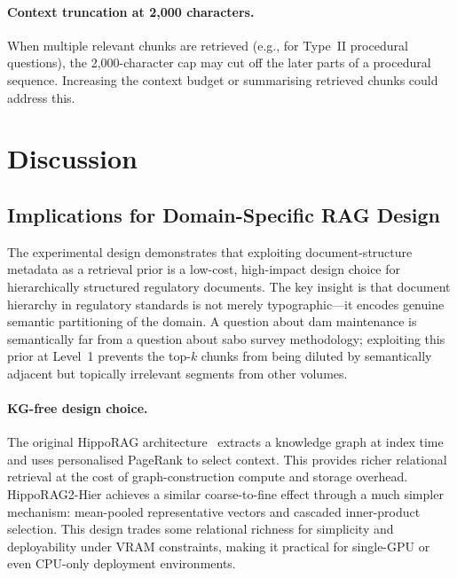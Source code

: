 \documentclass[twocolumn]{article}
\begin{document}
\paragraph{Context truncation at 2,000 characters.}
When multiple relevant chunks are retrieved (e.g., for Type~II procedural
questions), the 2,000-character cap may cut off the later parts of a
procedural sequence.
Increasing the context budget or summarising retrieved chunks could address this.

\section{Discussion}
\label{sec:discussion}

\subsection{Implications for Domain-Specific RAG Design}

The experimental design demonstrates that exploiting document-structure metadata
as a retrieval prior is a low-cost, high-impact design choice for hierarchically
structured regulatory documents.
The key insight is that document hierarchy in regulatory standards is not merely
typographic---it encodes genuine semantic partitioning of the domain.
A question about dam maintenance is semantically far from a question about sabo
survey methodology; exploiting this prior at Level~1 prevents the top-$k$ chunks
from being diluted by semantically adjacent but topically irrelevant segments
from other volumes.

\paragraph{KG-free design choice.}
The original HippoRAG architecture~\cite{gutiontov2024hipporag2} extracts a
knowledge graph at index time and uses personalised PageRank to select context.
This provides richer relational retrieval at the cost of graph-construction
compute and storage overhead.
HippoRAG2-Hier achieves a similar coarse-to-fine effect through a much simpler
mechanism: mean-pooled representative vectors and cascaded inner-product selection.
This design trades some relational richness for simplicity and deployability
under VRAM constraints, making it practical for single-GPU or even CPU-only
deployment environments.
\end{document}
